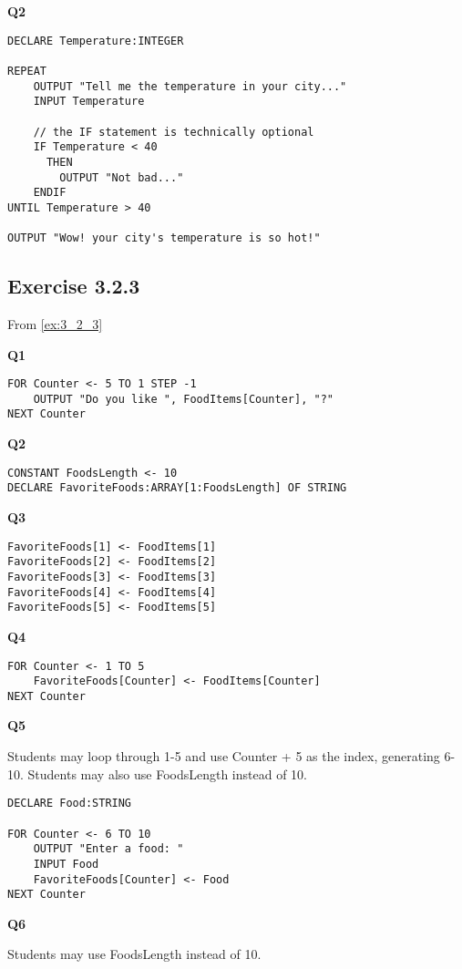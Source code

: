 \documentclass[./main.tex]{subfiles}
\begin{document}
\textbf{Q2}
\begin{verbatim}
DECLARE Temperature:INTEGER

REPEAT
    OUTPUT "Tell me the temperature in your city..."
    INPUT Temperature

    // the IF statement is technically optional
    IF Temperature < 40
      THEN
        OUTPUT "Not bad..."
    ENDIF
UNTIL Temperature > 40

OUTPUT "Wow! your city's temperature is so hot!"
\end{verbatim}

\subsection*{Exercise 3.2.3}
From \ref{ex:3_2_3}

\textbf{Q1}
\begin{verbatim}
FOR Counter <- 5 TO 1 STEP -1
    OUTPUT "Do you like ", FoodItems[Counter], "?"
NEXT Counter
\end{verbatim}

\textbf{Q2}
\begin{verbatim}
CONSTANT FoodsLength <- 10
DECLARE FavoriteFoods:ARRAY[1:FoodsLength] OF STRING
\end{verbatim}

\textbf{Q3}
\begin{verbatim}
FavoriteFoods[1] <- FoodItems[1]
FavoriteFoods[2] <- FoodItems[2]
FavoriteFoods[3] <- FoodItems[3]
FavoriteFoods[4] <- FoodItems[4]
FavoriteFoods[5] <- FoodItems[5]
\end{verbatim}

\textbf{Q4}
\begin{verbatim}
FOR Counter <- 1 TO 5
    FavoriteFoods[Counter] <- FoodItems[Counter]
NEXT Counter
\end{verbatim}

\textbf{Q5}

Students may loop through 1-5 and use {\ccmono Counter + 5} as the index, generating 6-10. Students may also use FoodsLength instead of 10.

\begin{verbatim}
DECLARE Food:STRING

FOR Counter <- 6 TO 10
    OUTPUT "Enter a food: "
    INPUT Food
    FavoriteFoods[Counter] <- Food
NEXT Counter
\end{verbatim}

\textbf{Q6}

Students may use FoodsLength instead of 10.
\end{document}
